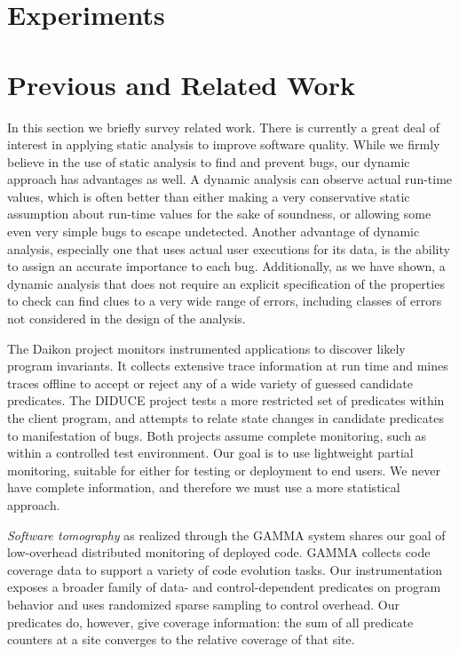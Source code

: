 \documentclass[draft]{sig-alternate}
\newcommand{\termdef}[1]{\emph{#1}}
\begin{document}
\section{Experiments}
\label{sec:experiments}




\section{Previous and Related Work}
\label{sec:related-work}

In this section we briefly survey related work. There is currently a
great deal of interest in applying static analysis to improve software
quality.  While we firmly believe in the use of static analysis to
find and prevent bugs, our dynamic approach has advantages as well.  A dynamic
analysis can observe actual run-time values, which is often better
than either making a very conservative static assumption about run-time
values for the sake of soundness, or allowing some even very simple bugs to escape
undetected.  Another advantage of dynamic analysis, especially one
that uses actual user executions for its data, is the ability to
assign an accurate importance to each bug.  Additionally, as we have shown,
a dynamic analysis that does not require an explicit specification of
the properties to check can find clues to a very wide range of errors,
including classes of errors not considered in the design of the
analysis.
  
The Daikon project \cite{ernst2001} monitors instrumented applications
to discover likely program invariants.  It collects extensive trace
information at run time and mines traces offline to accept or reject any
of a wide variety of guessed candidate predicates.  The DIDUCE project
\cite{ICSE02*291} tests a more restricted set of predicates within the
client program, and attempts to relate state changes in candidate
predicates to manifestation of bugs.  Both projects assume complete
monitoring, such as within a controlled test environment.  Our goal is
to use lightweight partial monitoring, suitable for either for testing
or deployment to end users.  We never have complete information, and
therefore we must use a more statistical approach.

\termdef{Software tomography} as realized through the GAMMA system
\cite{PASTE'02*2,Orso:2003:LFDIART} shares our goal of low-overhead
distributed monitoring of deployed code.  GAMMA collects code coverage
data to support a variety of code evolution tasks.  Our
instrumentation exposes a broader family of data- and
control-dependent predicates on program behavior and uses randomized
sparse sampling to control overhead.  Our
predicates do, however, give coverage information: the sum of all predicate counters at a site converges to the relative coverage of that site.
\end{document}
